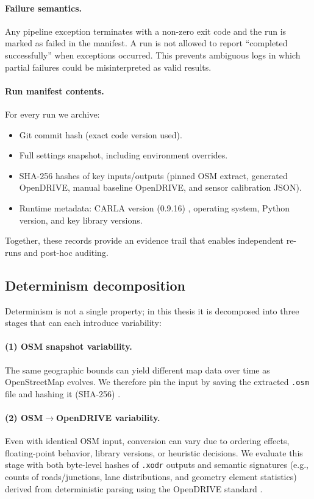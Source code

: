 \paragraph{Failure semantics.}
Any pipeline exception terminates with a non-zero exit code and the run is marked as failed in the manifest.
A run is not allowed to report ``completed successfully'' when exceptions occurred.
This prevents ambiguous logs in which partial failures could be misinterpreted as valid results.

\paragraph{Run manifest contents.}
For every run we archive:
\begin{itemize}
  \item Git commit hash (exact code version used).
  \item Full settings snapshot, including environment overrides.
  \item SHA-256 hashes of key inputs/outputs (pinned OSM extract, generated OpenDRIVE, manual baseline OpenDRIVE, and sensor calibration JSON).
  \item Runtime metadata: CARLA version (0.9.16) \cite{dosovitskiy2017carla}, operating system, Python version, and key library versions.
\end{itemize}
Together, these records provide an evidence trail that enables independent re-runs and post-hoc auditing.

\subsection{Determinism decomposition}
\label{sec:determinism_decomposition}
Determinism is not a single property; in this thesis it is decomposed into three stages that can each introduce variability:

\paragraph{(1) OSM snapshot variability.}
The same geographic bounds can yield different map data over time as OpenStreetMap evolves.
We therefore pin the input by saving the extracted \texttt{.osm} file and hashing it (SHA-256) \cite{openstreetmap_copyright,odbl10}.

\paragraph{(2) OSM$\rightarrow$OpenDRIVE variability.}
Even with identical OSM input, conversion can vary due to ordering effects, floating-point behavior, library versions, or heuristic decisions.
We evaluate this stage with both byte-level hashes of \texttt{.xodr} outputs and semantic signatures (e.g., counts of roads/junctions, lane distributions, and geometry element statistics) derived from deterministic parsing using the OpenDRIVE standard \cite{asam_opendrive_1_7}.


